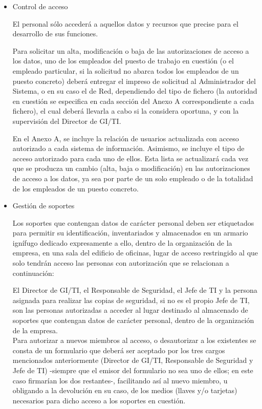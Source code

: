 \documentclass[a4paper,11pt,bibtotoc,noliststotoc]{scrbook}
\begin{document}
\begin{itemize}
\item Control de acceso

El personal sólo accederá a aquellos datos y recursos que precise para el desarrollo de sus funciones.

Para solicitar un alta, modificación o baja de las autorizaciones de acceso a los datos, uno de los empleados del puesto de trabajo en cuestión (o el empleado particular, si la solicitud no abarca todos los empleados de un puesto concreto) deberá entregar el impreso de solicitud al Administrador del Sistema, o en su caso el de Red, dependiendo del tipo de fichero (la autoridad en cuestión se especifica en cada sección del Anexo A correspondiente a cada fichero), el cual deberá llevarla a cabo si la considera oportuna, y con la supervisión del Director de GI/TI.

En el Anexo A, se incluye la relación de usuarios actualizada con acceso autorizado a cada sistema de información. Asimismo, se incluye el tipo de acceso autorizado para cada uno de ellos. Esta lista se actualizará cada vez que se producza un cambio (alta, baja o modificación) en las autorizaciones de acceso a los datos, ya sea por parte de un solo empleado o de la totalidad de los empleados de un puesto concreto.


\item Gestión de soportes

Los soportes que contengan datos de carácter personal deben ser etiquetados para permitir su identificación, inventariados y almacenados en un armario ignífugo dedicado expresamente a ello, dentro de la organización de la empresa, en una sala del edificio de oficinas, lugar de acceso restringido al que solo tendrán acceso las personas con autorización que se relacionan a continuación:

El Director de GI/TI, el Responsable de Seguridad, el Jefe de TI y la persona asignada para realizar las copias de seguridad, si no es el propio Jefe de TI, son las personas autorizadas a acceder al lugar destinado al almacenado de soportes que contengan datos de carácter personal, dentro de la organización de la empresa. \\
Para autorizar a nuevos miembros al acceso, o desautorizar a los existentes se consta de un formulario que deberá ser aceptado por los tres cargos mencionados anteriormente (Director de GI/TI, Responsable de Seguridad y Jefe de TI) -siempre que el emisor del formulario no sea uno de ellos; en este caso firmarían los dos restantes-, facilitando así al nuevo miembro, u obligando a la devolución en su caso, de los medios (llaves y/o tarjetas) necesarios para dicho acceso a los soportes en cuestión.


\end{itemize}
\end{document}

